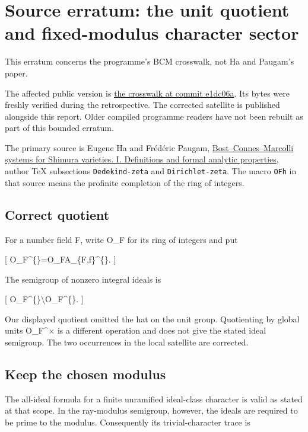 \documentclass[
]{article}
\author{}
\date{}
\begin{document}
\section{Source erratum: the unit quotient and fixed-modulus character
sector}\label{source-erratum-the-unit-quotient-and-fixed-modulus-character-sector}

This erratum concerns the programme's BCM crosswalk, not Ha and Paugam's
paper.

The affected public version is
\href{https://github.com/KokunoYumeto/zeta-function-research-reader/blob/e1dc06aa68bb810cf7d8b0006942f5b036b8b765/satellites/21_bcm_shimura_dirichlet_crosswalk.tex}{the
crosswalk at commit e1dc06a}. Its bytes were freshly verified during the
retrospective. The corrected satellite is published alongside this
report. Older compiled programme readers have not been rebuilt as part
of this bounded erratum.

The primary source is Eugene Ha and Frédéric Paugam,
\href{https://arxiv.org/abs/math/0507101v1}{Bost--Connes--Marcolli
systems for Shimura varieties. I. Definitions and formal analytic
properties}, author TeX subsections \texttt{Dedekind-zeta} and
\texttt{Dirichlet-zeta}. The macro \texttt{OFh} in that source means the
profinite completion of the ring of integers.

\subsection{Correct quotient}\label{correct-quotient}

For a number field F, write O\_F for its ring of integers and put

{[}
\widehat O\_F\^{}\{\natural\}=\widehat O\_F\cap\mathbb A\_\{F,f\}\^{}\{\times\}.
{]}

The semigroup of nonzero integral ideals is

{[} \widehat O\_F\^{}\{\times\}\backslash\widehat O\_F\^{}\{\natural\}.
{]}

Our displayed quotient omitted the hat on the unit group. Quotienting by
global units O\_F\^{}× is a different operation and does not give the
stated ideal semigroup. The two occurrences in the local satellite are
corrected.

\subsection{Keep the chosen modulus}\label{keep-the-chosen-modulus}

The all-ideal formula for a finite unramified ideal-class character is
valid as stated at that scope. In the ray-modulus semigroup, however,
the ideals are required to be prime to the modulus. Consequently its
trivial-character trace is
\end{document}
